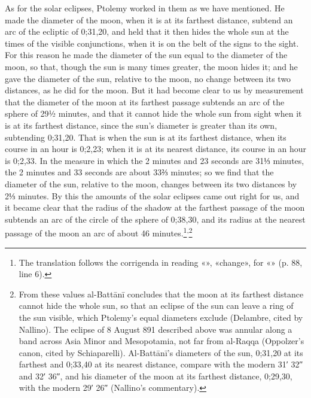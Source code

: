 \documentclass[11pt]{article}
\begin{document}
\par As for the solar eclipses, Ptolemy worked in them as we have mentioned. He made the diameter of the moon, when it is at its farthest distance, subtend an arc of the ecliptic of 0;31,20, and held that it then hides the whole sun at the times of the visible conjunctions, when it is on the belt of the signs to the sight. For this reason he made the diameter of the sun equal to the diameter of the moon, so that, though the sun is many times greater, the moon hides it; and he gave the diameter of the sun, relative to the moon, no change between its two distances, as he did for the moon. But it had become clear to us by measurement that the diameter of the moon at its farthest passage subtends an arc of the sphere of 29½ minutes, and that it cannot hide the whole sun from sight when it is at its farthest distance, since the sun's diameter is greater than its own, subtending 0;31,20. That is when the sun is at its farthest distance, when its course in an hour is 0;2,23; when it is at its nearest distance, its course in an hour is 0;2,33. In the measure in which the 2 minutes and 23 seconds are 31⅓ minutes, the 2 minutes and 33 seconds are about 33⅔ minutes; so we find that the diameter of the sun, relative to the moon, changes between its two distances by 2⅓ minutes. By this the amounts of the solar eclipses came out right for us, and it became clear that the radius of the shadow at the farthest passage of the moon subtends an arc of the circle of the sphere of 0;38,30, and its radius at the nearest passage of the moon an arc of about 46 minutes.\footnote{The translation follows the corrigenda in reading «», «change», for «» (p. 88, line 6).}\textsuperscript{,}\footnote{From these values al-Battānī concludes that the moon at its farthest distance cannot hide the whole sun, so that an eclipse of the sun can leave a ring of the sun visible, which Ptolemy's equal diameters exclude (Delambre, cited by Nallino). The eclipse of 8 August 891 described above was annular along a band across Asia Minor and Mesopotamia, not far from al-Raqqa (Oppolzer's canon, cited by Schiaparelli). Al-Battānī's diameters of the sun, 0;31,20 at its farthest and 0;33,40 at its nearest distance, compare with the modern 31′ 32″ and 32′ 36″, and his diameter of the moon at its farthest distance, 0;29,30, with the modern 29′ 26″ (Nallino's commentary).}\par
\end{document}
